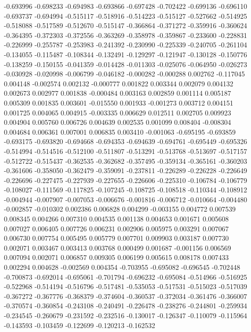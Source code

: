 -0.693996
-0.698233
-0.694983
-0.693866
-0.697428
-0.702422
-0.699136
-0.696110
-0.693737
-0.694994
-0.515117
-0.518916
-0.514223
-0.515127
-0.527662
-0.514925
-0.518088
-0.517589
-0.512670
-0.515147
-0.366864
-0.371272
-0.359916
-0.360624
-0.364395
-0.372303
-0.372556
-0.363269
-0.358978
-0.359867
-0.233600
-0.228831
-0.226999
-0.255787
-0.253983
-0.241392
-0.230990
-0.225339
-0.240705
-0.261104
-0.134055
-0.115487
-0.108344
-0.132491
-0.129297
-0.121947
-0.130128
-0.150776
-0.138259
-0.150155
-0.041359
-0.014428
-0.011303
-0.025076
-0.064950
-0.026273
-0.030928
-0.020998
-0.006799
-0.046182
-0.000282
-0.000288
0.002762
-0.117045
0.004148
-0.002574
0.002132
-0.000777
0.001822
0.003344
0.002079
0.004132
0.002673
0.002977
0.001838
-0.000484
0.003163
0.002859
0.001114
0.005187
0.005309
0.001835
0.003601
-0.015550
0.001933
-0.001273
0.003712
0.004151
0.001725
0.004065
0.004915
-0.003335
0.006629
0.012511
0.002705
0.009923
0.004904
0.005760
0.006726
0.004639
0.002535
0.001099
0.008404
-0.008304
0.004684
0.006361
0.007001
0.006835
0.003410
-0.001063
-0.695195
-0.693859
-0.693175
-0.693820
-0.694668
-0.694353
-0.694639
-0.694761
-0.695449
-0.695326
-0.514994
-0.514516
-0.512100
-0.511807
-0.513291
-0.513768
-0.513697
-0.517157
-0.512722
-0.515437
-0.362535
-0.362682
-0.357495
-0.359134
-0.365161
-0.360203
-0.361606
-0.358050
-0.362479
-0.359091
-0.237811
-0.226289
-0.226228
-0.226649
-0.226696
-0.227475
-0.227939
-0.227655
-0.226606
-0.225310
-0.106784
-0.106779
-0.108027
-0.111569
-0.117825
-0.107245
-0.108725
-0.108518
-0.110344
-0.108912
-0.004944
-0.007907
-0.007053
-0.006676
-0.001816
-0.006712
-0.010664
-0.004480
-0.002857
-0.010302
0.002386
0.006828
0.004299
-0.003155
0.004772
0.007539
0.008345
0.004266
0.007310
0.004535
0.001138
0.004653
0.001671
0.005608
0.007027
0.006405
0.007726
0.006231
0.002906
0.005975
0.003291
0.007067
0.006730
0.007754
0.005495
0.005779
0.007701
0.009903
0.003187
0.007730
0.002071
0.003467
0.003413
0.003768
0.000499
0.001687
-0.001156
0.006569
0.007094
0.002071
0.006857
0.009305
0.006199
0.005615
0.008178
0.007433
0.002294
0.004628
-0.002569
0.004354
-0.703955
-0.695082
-0.696545
-0.702448
-0.700873
-0.692014
-0.695061
-0.701794
-0.696232
-0.695084
-0.514966
-0.516925
-0.522968
-0.514194
-0.516796
-0.517481
-0.535053
-0.517531
-0.515023
-0.517039
-0.367272
-0.367776
-0.368379
-0.374604
-0.360537
-0.372034
-0.361476
-0.366007
-0.370574
-0.360854
-0.243108
-0.240491
-0.226478
-0.238276
-0.244801
-0.259934
-0.234545
-0.260679
-0.231592
-0.232516
-0.130017
-0.126347
-0.110079
-0.115964
-0.143593
-0.103459
-0.122699
-0.120213
-0.162532
